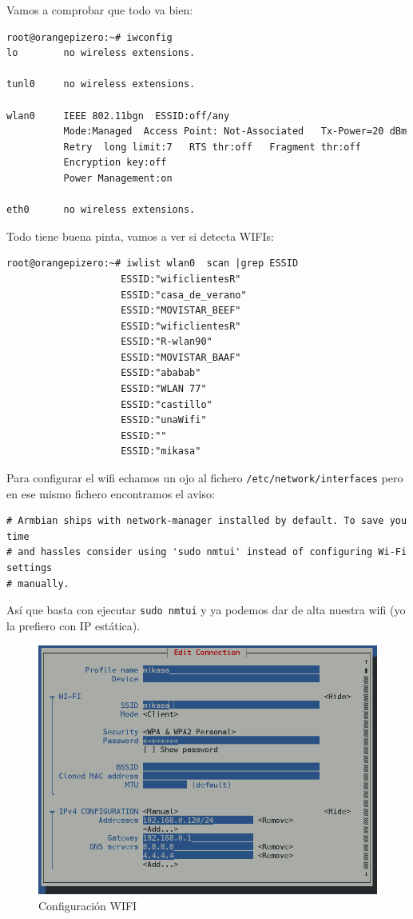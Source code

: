\documentclass[12pt,spanish,]{scrartcl}
\begin{document}
Vamos a comprobar que todo va bien:

\begin{verbatim}
root@orangepizero:~# iwconfig
lo        no wireless extensions.

tunl0     no wireless extensions.

wlan0     IEEE 802.11bgn  ESSID:off/any
          Mode:Managed  Access Point: Not-Associated   Tx-Power=20 dBm
          Retry  long limit:7   RTS thr:off   Fragment thr:off
          Encryption key:off
          Power Management:on

eth0      no wireless extensions.
\end{verbatim}

Todo tiene buena pinta, vamos a ver si detecta WIFIs:

\begin{verbatim}
root@orangepizero:~# iwlist wlan0  scan |grep ESSID
                    ESSID:"wificlientesR"
                    ESSID:"casa_de_verano"
                    ESSID:"MOVISTAR_BEEF"
                    ESSID:"wificlientesR"
                    ESSID:"R-wlan90"
                    ESSID:"MOVISTAR_BAAF"
                    ESSID:"ababab"
                    ESSID:"WLAN 77"
                    ESSID:"castillo"
                    ESSID:"unaWifi"
                    ESSID:""
                    ESSID:"mikasa"
\end{verbatim}

Para configurar el wifi echamos un ojo al fichero
\texttt{/etc/network/interfaces} pero en ese mismo fichero encontramos
el aviso:

\begin{verbatim}
# Armbian ships with network-manager installed by default. To save you time
# and hassles consider using 'sudo nmtui' instead of configuring Wi-Fi settings
# manually.
\end{verbatim}

Así que basta con ejecutar \texttt{sudo\ nmtui} y ya podemos dar de alta
nuestra wifi (yo la prefiero con IP estática).

\begin{figure}[htbp]
\centering
\includegraphics{src/img/OrangePiZero_tmtui.png}
\caption{Configuración WIFI}
\end{figure}
\end{document}
